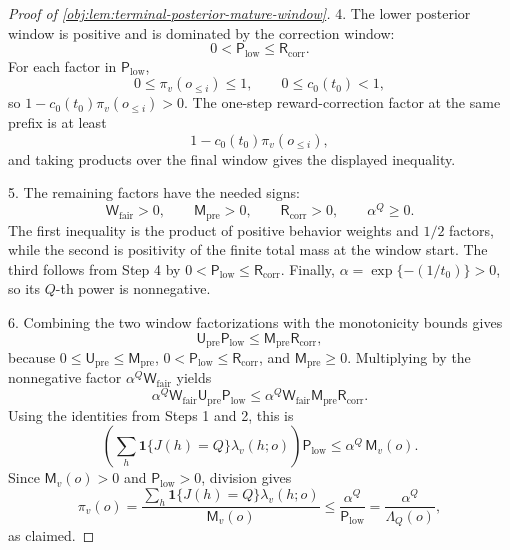 \begin{proof}[Proof of \cref{obj:lem:terminal-posterior-mature-window}]
4. The lower posterior window is positive and is dominated by the correction window:
\[
0<\mathsf P_{\mathrm{low}}\le \mathsf R_{\mathrm{corr}} .
\]
For each factor in \(\mathsf P_{\mathrm{low}}\),
\[
0\le \pi_v(o_{\le i})\le 1,
\qquad
0\le c_0(t_0)<1,
\]
so \(1-c_0(t_0)\pi_v(o_{\le i})>0\).  The one-step reward-correction factor at the same prefix is at least
\[
1-c_0(t_0)\pi_v(o_{\le i}),
\]
and taking products over the final window gives the displayed inequality. %

5. The remaining factors have the needed signs:
\[
\mathsf W_{\mathrm{fair}}>0,\qquad
\mathsf M_{\mathrm{pre}}>0,\qquad
\mathsf R_{\mathrm{corr}}>0,\qquad
\alpha^Q\ge 0 .
\]
The first inequality is the product of positive behavior weights and \(1/2\) factors, while the second is positivity of the finite total mass at the window start.  The third follows from Step 4 by \(0<\mathsf P_{\mathrm{low}}\le \mathsf R_{\mathrm{corr}}\).  Finally, \(\alpha=\exp\{-(1/t_0)\}>0\), so its \(Q\)-th power is nonnegative. %

6. Combining the two window factorizations with the monotonicity bounds gives
\[
\mathsf U_{\mathrm{pre}}\mathsf P_{\mathrm{low}}
\le
\mathsf M_{\mathrm{pre}}\mathsf R_{\mathrm{corr}},
\]
because \(0\le \mathsf U_{\mathrm{pre}}\le \mathsf M_{\mathrm{pre}}\), \(0<\mathsf P_{\mathrm{low}}\le \mathsf R_{\mathrm{corr}}\), and \(\mathsf M_{\mathrm{pre}}\ge0\).  Multiplying by the nonnegative factor
\(\alpha^Q\mathsf W_{\mathrm{fair}}\) yields
\[
\alpha^Q\mathsf W_{\mathrm{fair}}\mathsf U_{\mathrm{pre}}\mathsf P_{\mathrm{low}}
\le
\alpha^Q\mathsf W_{\mathrm{fair}}\mathsf M_{\mathrm{pre}}\mathsf R_{\mathrm{corr}} .
\]
Using the identities from Steps 1 and 2, this is
\[
\left(
\sum_h \mathbf 1\{J(h)=Q\}\lambda_v(h;o)
\right)\mathsf P_{\mathrm{low}}
\le
\alpha^Q\,\mathsf M_v(o).
\]
Since \(\mathsf M_v(o)>0\) and \(\mathsf P_{\mathrm{low}}>0\), division gives
\[
\pi_v(o)
=
\frac{
\sum_h \mathbf 1\{J(h)=Q\}\lambda_v(h;o)
}{
\mathsf M_v(o)
}
\le
\frac{\alpha^Q}{\mathsf P_{\mathrm{low}}}
=
\frac{\alpha^Q}{\Lambda_Q(o)} ,
\]
as claimed. %
\end{proof}

